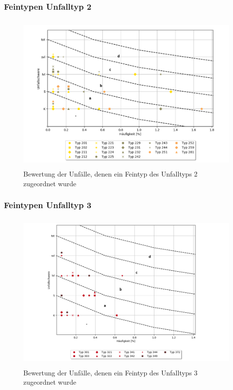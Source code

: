 \subsubsection{Feintypen Unfalltyp 2}


\begin{savenotes}
	\begin{figure}[H]
		\centering
		\includegraphics[width=12cm,height=8cm]{figures/Bewertung_FT2}
		\caption[Bewertung der Unfälle, denen ein Feintyp des Unfalltyps 2 zugeordnet wurde]{Bewertung der Unfälle, denen ein Feintyp des Unfalltyps 2 zugeordnet wurde}\label{fig:Bewertung_FT2}
	\end{figure}
\end{savenotes}

\subsubsection{Feintypen Unfalltyp 3}


\begin{savenotes}
	\begin{figure}[H]
		\centering
		\includegraphics[width=12cm,height=8cm]{figures/Bewertung_FT3}
		\caption[Bewertung der Unfälle, denen ein Feintyp des Unfalltyps 3 zugeordnet wurde]{Bewertung der Unfälle, denen ein Feintyp des Unfalltyps 3 zugeordnet wurde}\label{fig:Bewertung_FT3}
	\end{figure}
\end{savenotes}

